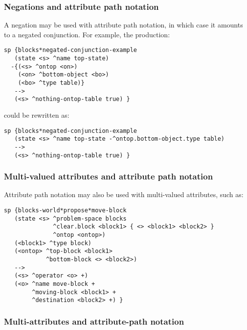 \subsubsection*{Negations and attribute path notation}


A negation may be used with attribute path notation, in which case it amounts
to a negated conjunction. For example, the production:

\begin{verbatim}
sp {blocks*negated-conjunction-example
   (state <s> ^name top-state)
  -{(<s> ^ontop <on>)
    (<on> ^bottom-object <bo>)
    (<bo> ^type table)}
   -->
   (<s> ^nothing-ontop-table true) } 
\end{verbatim}

could be rewritten as:

\begin{verbatim}
sp {blocks*negated-conjunction-example
   (state <s> ^name top-state -^ontop.bottom-object.type table)
   -->
   (<s> ^nothing-ontop-table true) }
\end{verbatim}


\subsubsection*{Multi-valued attributes and attribute path notation}


Attribute path notation may also be used with multi-valued attributes, such as:

\begin{verbatim}
sp {blocks-world*propose*move-block
   (state <s> ^problem-space blocks
              ^clear.block <block1> { <> <block1> <block2> }
              ^ontop <ontop>)
   (<block1> ^type block)
   (<ontop> ^top-block <block1>
            ^bottom-block <> <block2>)
   -->
   (<s> ^operator <o> +)
   (<o> ^name move-block +
        ^moving-block <block1> +
        ^destination <block2> +) }
\end{verbatim}


\subsubsection*{Multi-attributes and attribute-path notation}
\label{SYNTAX-pm-lhs-caveat}

